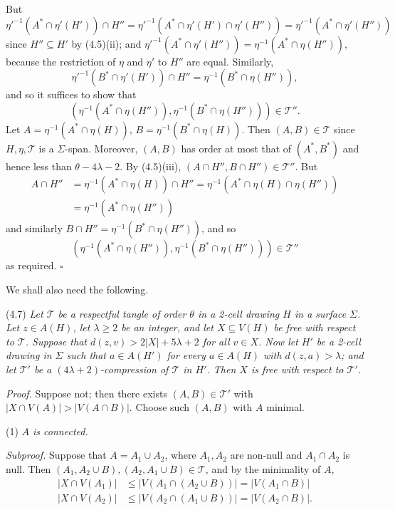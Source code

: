 But
\begin{equation*}
\eta'^{-1}(A^* \cap \eta'(H')) \cap H'' = \eta'^{-1}(A^* \cap \eta'(H') \cap \eta'(H'')) = \eta'^{-1}(A^* \cap \eta'(H''))
\end{equation*}
since $H'' \subseteq H'$ by (4.5)(ii); and $\eta'^{-1}(A^* \cap \eta'(H'')) = \eta^{-1}(A^* \cap \eta(H'')),$ because the restriction of $\eta$ and $\eta'$ to $H''$ are equal. Similarly,
\begin{equation*}
\eta'^{-1}(B^* \cap \eta'(H')) \cap H'' = \eta^{-1}(B^* \cap \eta(H'')),
\end{equation*}
and so it suffices to show that
\begin{equation*}
(\eta^{-1}(A^* \cap \eta(H'')), \eta^{-1}(B^* \cap \eta(H''))) \in \mathcal{T}''.
\end{equation*}
Let $A = \eta^{-1}(A^* \cap \eta(H))$, $B = \eta^{-1}(B^* \cap \eta(H))$. Then $(A, B) \in \mathcal{T}$ since $H, \eta, \mathcal{T}$ is a $\Sigma$-span. Moreover, $(A, B)$ has order at most that of $(A^*, B^*)$ and hence less than $\theta - 4\lambda - 2$. By (4.5)(iii), $(A \cap H'', B \cap H'') \in \mathcal{T}''$. But
\begin{align*}
A \cap H'' &= \eta^{-1}(A^* \cap \eta(H)) \cap H'' = \eta^{-1}(A^* \cap \eta(H) \cap \eta(H'')) \\
&= \eta^{-1}(A^* \cap \eta(H''))
\end{align*}
and similarly $B \cap H'' = \eta^{-1}(B^* \cap \eta(H''))$, and so
\begin{equation*}
(\eta^{-1}(A^* \cap \eta(H'')), \eta^{-1}(B^* \cap \eta(H''))) \in \mathcal{T}''
\end{equation*}
as required. $\square$

We shall also need the following.

\stmt
(4.7) \textit{Let $\mathcal{T}$ be a respectful tangle of order $\theta$ in a 2-cell drawing $H$ in a surface $\Sigma$. Let $z \in A(H)$, let $\lambda \ge 2$ be an integer, and let $X \subseteq V(H)$ be free with respect to $\mathcal{T}$. Suppose that $d(z, v) > 2|X| + 5\lambda + 2$ for all $v \in X$. Now let $H'$ be a 2-cell drawing in $\Sigma$ such that $a \in A(H')$ for every $a \in A(H)$ with $d(z, a) > \lambda$; and let $\mathcal{T}'$ be a $(4\lambda + 2)$-compression of $\mathcal{T}$ in $H'$. Then $X$ is free with respect to $\mathcal{T}'$.}

\textit{Proof.} Suppose not; then there exists $(A, B) \in \mathcal{T}'$ with $|X \cap V(A)| > |V(A \cap B)|$. Choose such $(A, B)$ with $A$ minimal.

\hspace*{12pt}(1) \textit{$A$ is connected.}

\textit{Subproof.} Suppose that $A = A_1 \cup A_2$, where $A_1, A_2$ are non-null and $A_1 \cap A_2$ is null. Then $(A_1, A_2 \cup B), (A_2, A_1 \cup B) \in \mathcal{T}$, and by the minimality of $A$,
\begin{align*}
|X \cap V(A_1)| &\le |V(A_1 \cap (A_2 \cup B))| = |V(A_1 \cap B)| \\
|X \cap V(A_2)| &\le |V(A_2 \cap (A_1 \cup B))| = |V(A_2 \cap B)|.
\end{align*}
